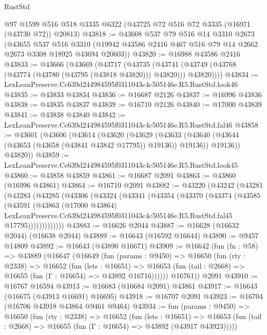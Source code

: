 \begin{lexlean}{RustStd}
\begin{coremodule}
    @97
    @1599
    @516
    @518
    @3335
    @6322
    (@43725 @72 @516 @72 @3335 (@16971 (@43730 @72)) @20813)
@43818 := @43608
    @537
    @79
    @516
    @14
    @3310
    @2673
    (@43655
      @537
      @516
      @3310
      (@19942 @43586 @2416 @467 @516 @79 @14 @2662 @2673 @3308 @18925 @43694 @20603))
@43820 := @16988 @43586 @2416
@43833 := @43666
    (@43669
      (@43717
        (@43735
          (@43741 (@43749 (@43768 (@43774 (@43780 (@43795 (@43818 @43820))) @43820))) @43820))))
@43834 := LexLeanPreserve.Cc639d244984595f0311043c4c505146e.R5.RustStd.look46
@43835 := @43833 @43834
@43836 := @16687 @2126
@43837 := @16996 @43836
@43838 := @43835 @43837
@43839 := @16710 @2126
@43840 := @17000 @43839
@43841 := @43838 @43840
@43842 := LexLeanPreserve.Cc639d244984595f0311043c4c505146e.R5.RustStd.fal46
@43858 := @43601
    (@43606
      (@43614
        (@43620
          (@43629
            (@43633 (@43640 (@43644 (@43653 (@43658 (@43841 @43842 @17795)) @19136)) @19136))
            @19136))
        @43820))
@43859 := LexLeanPreserve.Cc639d244984595f0311043c4c505146e.R5.RustStd.look45
@43860 := @43858 @43859
@43861 := @16687 @2091
@43863 := @43860 (@16996 @43861)
@43864 := @16710 @2091
@43882 := @43220
    (@43242
      (@43281
        (@43283
          (@43285
            (@43306
              (@43324
                (@43341
                  (@43354
                    (@43370
                      (@43374
                        (@43585
                          (@43591
                            (@43863
                              (@17000 @43864)
                              LexLeanPreserve.Cc639d244984595f0311043c4c505146e.R5.RustStd.fal45
                              @17795)))))))))))))
@43883 := @16626 @2044
@43887 := @16628 (@16632 @2044) (@16638 @2044)
@43889 := @16643 (@16592 @16644)
@43890 := @9457 @14809
@43892 := @16643 (@43890 @16671)
@43909 := @16642
    (fun (fn : @58) =>
    @43889
      (@16647
        (@16649
          (fun (params : @9450) =>
          @16650
            (fun (rty : @2338) =>
            @16652
              (fun (lets : @16651) =>
              @16653 (fun (tail : @2668) => @16655 (fun (Γ : @16654) => @43892 @16716))))))
        @16761))
    @2091
@43910 := @16767 @16594
@43913 := @16683 (@16684 @2091) @43861
@43917 := @16643 (@16675 (@43913 @16691) @16695)
@43918 := @16707 @2091
@43923 := @16704 (@16706 @43918 @43864 @9461 @9464)
@43934 := fun (params : @9450) =>
  @16650
    (fun (rty : @2338) =>
    @16652
      (fun (lets : @16651) =>
      @16653 (fun (tail : @2668) => @16655 (fun (Γ : @16654) => @43892 (@43917 @43923)))))

\end{coremodule}
\end{lexlean}

